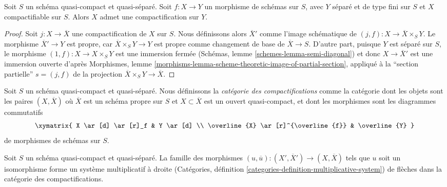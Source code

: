 \begin{lemma}
\label{lemma-compactifyable}
Soit $S$ un schéma quasi-compact et quasi-séparé. Soit $f : X \to Y$
un morphisme de schémas sur $S$, avec $Y$ séparé et de type fini
sur $S$ et $X$ compactifiable sur $S$. Alors $X$ admet une compactification
sur $Y$.
\end{lemma}

\begin{proof}
Soit $j : X \to \overline{X}$ une compactification de $X$ sur $S$.
Nous définissons alors $\overline{X}'$ comme
l'image schématique de $(j, f) : X \to \overline{X} \times_S Y$.
Le morphisme $\overline{X}' \to Y$ est propre, car
$\overline{X} \times_S Y \to Y$ est propre comme changement de base de
$\overline{X} \to S$. D'autre part, puisque $Y$ est séparé
sur $S$, le morphisme $(1, f) : X \to X \times_S Y$ est une
immersion fermée (Schémas, lemme \ref{schemes-lemma-semi-diagonal})
et donc $X \to \overline{X}'$ est une immersion ouverte d'après Morphismes, lemme
\ref{morphisms-lemma-scheme-theoretic-image-of-partial-section}, appliqué
à la ``section partielle'' $s = (j, f)$ de la projection
$\overline{X} \times_S Y \to \overline{X}$.
\end{proof}

\noindent
Soit $S$ un schéma quasi-compact et quasi-séparé.
Nous définissons la {\it catégorie des compactifications} comme la catégorie
dont les objets sont les paires $(X, \overline{X})$ où $\overline{X}$
est un schéma propre sur $S$ et $X \subset \overline{X}$ est un
ouvert quasi-compact, et dont les morphismes
sont les diagrammes commutatifs
$$
\xymatrix{
X \ar[d] \ar[r]_f & Y \ar[d] \\
\overline{X} \ar[r]^{\overline{f}} & \overline{Y}
}
$$
de morphismes de schémas sur $S$.

\begin{lemma}
\label{lemma-right-multiplicative-system}
Soit $S$ un schéma quasi-compact et quasi-séparé.
La famille des morphismes
$(u, \overline{u}) : (X', \overline{X}') \to (X, \overline{X})$
tels que $u$ soit un isomorphisme forme un système multiplicatif à droite
(Catégories, définition \ref{categories-definition-multiplicative-system})
de flèches dans la catégorie des compactifications.
\end{lemma}

